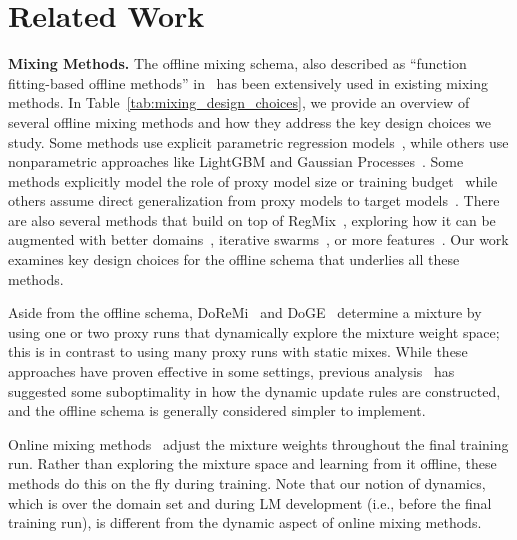 \section{Related Work}

\textbf{Mixing Methods.} The offline mixing schema, also described as ``function fitting-based offline methods'' in~\citet{liu2025rethinkingdatamixturelarge} has been extensively used in existing mixing methods. In Table~\ref{tab:mixing_design_choices}, we provide an overview of several offline mixing methods and how they address the key design choices we study. Some methods use explicit parametric regression models~\citep{que2024dcptlawdomainspecificcontinual}, while others use nonparametric approaches like LightGBM and Gaussian Processes~\citep{liu2025regmixdatamixtureregression, chen2025admirebayesoptaccelerateddatamixture}. Some methods explicitly model the role of proxy model size or training budget~\citep{ge2025bimixbivariatedatamixing, ye2025datamixinglawsoptimizing, kang2025autoscalescaleawaredatamixing} while others assume direct generalization from proxy models to target models~\citep{held2025optimizingpretrainingdatamixtures}. There are also several methods that build on top of RegMix~\citep{liu2025regmixdatamixtureregression}, exploring how it can be augmented with better domains~\citep{wettig2025organizewebconstructingdomains}, iterative swarms~\citep{diao2025climbclusteringbasediterativedata}, or more features~\citep{belenki2025optimizingpretrainingdatamixtures}. Our work examines key design choices for the offline schema that underlies all these methods. 


Aside from the offline schema, DoReMi~\citep{xie2023doremioptimizingdatamixtures} and DoGE~\citep{fan2024dogedomainreweightinggeneralization} determine a mixture by using one or two proxy runs that dynamically explore the mixture weight space; this is in contrast to using many proxy runs with static mixes. While these approaches have proven effective in some settings, previous analysis~\citep{chen2025aioliunifiedoptimizationframework} has suggested some suboptimality in how the dynamic update rules are constructed, and the offline schema is generally considered simpler to implement.


Online mixing methods~\citep{chen2023skillitdatadrivenskillsframework, jiang2024adaptivedataoptimizationdynamic, albalak2023efficientonlinedatamixing} adjust the mixture weights throughout the final training run. Rather than exploring the mixture space and learning from it offline, these methods do this on the fly during training. Note that our notion of dynamics, which is over the domain set and during LM development (i.e., before the final training run), is different from the dynamic aspect of online mixing methods.

